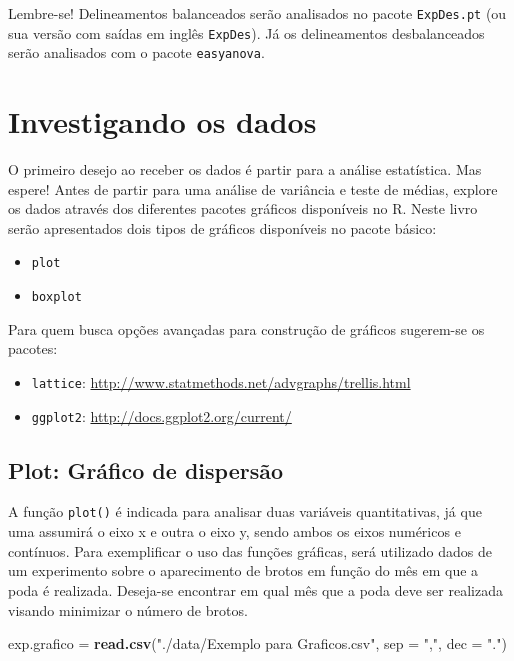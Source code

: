 \documentclass[
]{article}
\newenvironment{Shaded}{\begin{snugshade}}{\end{snugshade}}
\newcommand{\DataTypeTok}[1]{\textcolor[rgb]{0.13,0.29,0.53}{#1}}
\newcommand{\KeywordTok}[1]{\textcolor[rgb]{0.13,0.29,0.53}{\textbf{#1}}}
\newcommand{\NormalTok}[1]{#1}
\newcommand{\StringTok}[1]{\textcolor[rgb]{0.31,0.60,0.02}{#1}}
\providecommand{\tightlist}{%
  \setlength{\itemsep}{0pt}\setlength{\parskip}{0pt}}
\begin{document}
Lembre-se! Delineamentos balanceados serão analisados no pacote \texttt{ExpDes.pt} (ou sua versão com saídas em inglês \texttt{ExpDes}). Já os delineamentos desbalanceados serão analisados com o pacote \texttt{easyanova}.

\hypertarget{investigando-os-dados}{%
\section{Investigando os dados}\label{investigando-os-dados}}

O primeiro desejo ao receber os dados é partir para a análise estatística. Mas espere! Antes de partir para uma análise de variância e teste de médias, explore os dados através dos diferentes pacotes gráficos disponíveis no R. Neste livro serão apresentados dois tipos de gráficos disponíveis no pacote básico:

\begin{itemize}
\tightlist
\item
  \texttt{plot}
\item
  \texttt{boxplot}
\end{itemize}

Para quem busca opções avançadas para construção de gráficos sugerem-se os pacotes:

\begin{itemize}
\tightlist
\item
  \texttt{lattice}: \url{http://www.statmethods.net/advgraphs/trellis.html}
\item
  \texttt{ggplot2}: \url{http://docs.ggplot2.org/current/}
\end{itemize}

\hypertarget{plot-gruxe1fico-de-dispersuxe3o}{%
\subsection{Plot: Gráfico de dispersão}\label{plot-gruxe1fico-de-dispersuxe3o}}

A função \texttt{plot()} é indicada para analisar duas variáveis quantitativas, já que uma assumirá o eixo x e outra o eixo y, sendo ambos os eixos numéricos e contínuos. Para exemplificar o uso das funções gráficas, será utilizado dados de um experimento sobre o aparecimento de brotos em função do mês em que a poda é realizada. Deseja-se encontrar em qual mês que a poda deve ser realizada visando minimizar o número de brotos.

\begin{Shaded}
\begin{Highlighting}[]
\NormalTok{exp.grafico =}\StringTok{ }\KeywordTok{read.csv}\NormalTok{(}\StringTok{"./data/Exemplo para Graficos.csv"}\NormalTok{, }\DataTypeTok{sep =} \StringTok{","}\NormalTok{, }\DataTypeTok{dec =} \StringTok{"."}\NormalTok{)}
\end{Highlighting}
\end{Shaded}
\end{document}
